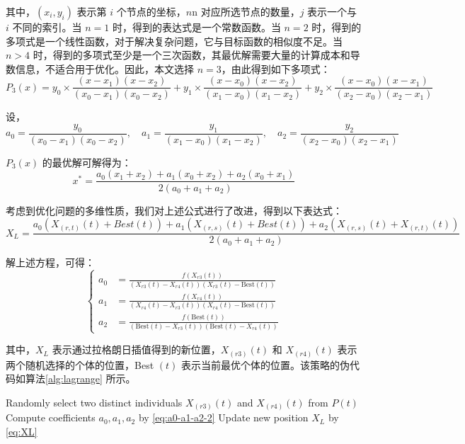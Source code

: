 \documentclass{wzuthesis}
\begin{document}
其中，$\left( {{x}_{i},{y}_{i}}\right)$ 表示第 $i$ 个节点的坐标，$n\mathrm{n}$ 对应所选节点的数量，$j$ 表示一个与 $i$ 不同的索引。当 $n = 1$ 时，得到的表达式是一个常数函数。当 $n = 2$ 时，得到的多项式是一个线性函数，对于解决复杂问题，它与目标函数的相似度不足。当 $n > 4$ 时，得到的多项式至少是一个三次函数，其最优解需要大量的计算成本和导数信息，不适合用于优化。因此，本文选择 $n = 3$，由此得到如下多项式：
\begin{equation}
    P_3(x) = y_0 \times \frac{(x-x_1)(x-x_2)}{(x_0-x_1)(x_0-x_2)} + y_1 \times \frac{(x-x_0)(x-x_2)}{(x_1-x_0)(x_1-x_2)} + y_2 \times \frac{(x-x_0)(x-x_1)}{(x_2-x_0)(x_2-x_1)}
\label{eq:P3}
\end{equation}

设，
\begin{equation}
    a_0 = \frac{y_0}{(x_0-x_1)(x_0-x_2)}, \quad a_1 = \frac{y_1}{(x_1-x_0)(x_1-x_2)}, \quad a_2 = \frac{y_2}{(x_2-x_0)(x_2-x_1)}
\label{eq:a0-a1-a2}
\end{equation}

${P}_{3}\left( x\right)$ 的最优解可解得为：
\begin{equation}
    x^* = \frac{a_0(x_1+x_2) + a_1(x_0+x_2) + a_2(x_0+x_1)}{2(a_0+a_1+a_2)}
\label{eq:X*}
\end{equation}

考虑到优化问题的多维性质，我们对上述公式进行了改进，得到以下表达式：
\begin{equation}
    X_L = \frac{a_0(X_{(r,t)}(t) + Best(t)) + a_1(X_{(r,s)}(t) + Best(t)) + a_2(X_{(r,s)}(t) + X_{(r,t)}(t))}{2(a_0+a_1+a_2)}
\label{eq:XL}
\end{equation}

解上述方程，可得：
\begin{equation}
\left\{
\begin{aligned}
a_0 &= \frac{f(X_{r3}(t))}{(X_{r3}(t)-X_{r4}(t))(X_{r3}(t)-\text{Best}(t))} \\
a_1 &= \frac{f(X_{r4}(t))}{(X_{r4}(t)-X_{r3}(t))(X_{r4}(t)-\text{Best}(t))} \\
a_2 &= \frac{f(\text{Best}(t))}{(\text{Best}(t)-X_{r3}(t))(\text{Best}(t)-X_{r4}(t))}
\end{aligned}
\right.
\label{eq:a0-a1-a2-2}
\end{equation}

其中，${X}_{L}$ 表示通过拉格朗日插值得到的新位置，${X}_{\left( r3\right) }\left( t\right)$ 和 ${X}_{\left( r4\right) }\left( t\right)$ 表示两个随机选择的个体的位置，Best $\left( t\right)$ 表示当前最优个体的位置。该策略的伪代码如算法\ref{alg:lagrange} 所示。
\begin{algorithm}[htbp]
    \caption{Lagrange Interpolation Method}
    \label{alg:lagrange}
    \SetAlgoLined
    
    Randomly select two distinct individuals $X_{(r3)}(t)$ and $X_{(r4)}(t)$ from $P(t)$ \;
    Compute coefficients $a_0, a_1, a_2$ by \ref{eq:a0-a1-a2-2} \;
    Update new position $X_L$ by \ref{eq:XL} \;
\end{algorithm}
\end{document}
